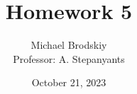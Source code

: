 


\title{Homework 5}
\date{October 21, 2023}
\author{Michael Brodskiy\\ \small Professor: A. Stepanyants}



\maketitle

